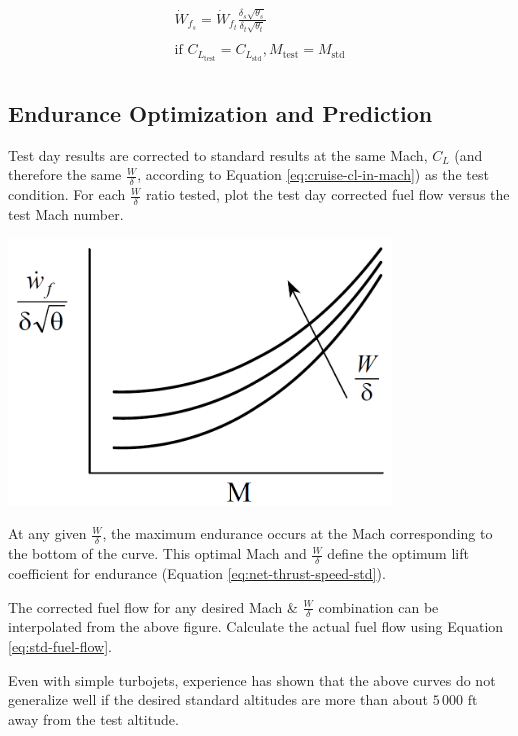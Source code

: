 \documentclass[
]{book}
\begin{document}
\[
\begin{align}
\dot{W}_{f_s} = \dot{W}_{f_t} \frac{\delta_s \sqrt{\theta_s}}{\delta_t \sqrt{\theta_t}} \\
\\
\text{if } C_{L_{\text{test}}} = C_{L_{\text{std}}}, M_{\text{test}} = M_{\text{std}} \\
\end{align}
\label{eq:std-fuel-flow}
\]

\hypertarget{endurance-optimization-and-prediction-1}{%
\subsection{Endurance Optimization and Prediction}\label{endurance-optimization-and-prediction-1}}

Test day results are corrected to standard results at the same Mach, \(C_L\)
(and therefore the same \(\frac{W}{\delta}\), according to Equation
\eqref{eq:cruise-cl-in-mach}) as the test condition. For each \(\frac{W}{\delta}\)
ratio tested, plot the test day corrected fuel flow versus the test Mach number.

\includegraphics[width=4in,height=\textheight]{media/12/test-corr-fuel-flow-m-curve.png}~

At any given \(\frac{W}{\delta}\), the maximum endurance occurs at the Mach
corresponding to the bottom of the curve. This optimal Mach and
\(\frac{W}{\delta}\) define the optimum lift coefficient for endurance
(Equation \eqref{eq:net-thrust-speed-std}).

The corrected fuel flow for any desired Mach \& \(\frac{W}{\delta}\) combination
can be interpolated from the above figure. Calculate the actual fuel flow using
Equation \eqref{eq:std-fuel-flow}.

Even with simple turbojets, experience has shown that the above curves do not
generalize well if the desired standard altitudes are more than about
\(5\,000 \text{ ft}\) away from the test altitude.
\end{document}
